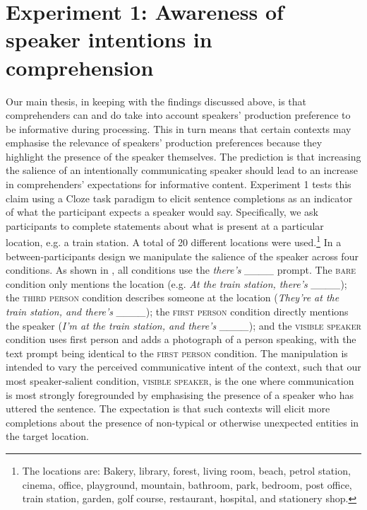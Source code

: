 \documentclass[output=paper,colorlinks,citecolor=brown]{langscibook}
\begin{document}
\section{Experiment 1: Awareness of speaker intentions in comprehension}
Our main thesis, in keeping with the findings discussed above, is that comprehenders can and do take into account speakers’ production preference to be informative during processing. This in turn means that certain contexts may emphasise the relevance of speakers’ production preferences because they highlight the presence of the speaker themselves. The prediction is that increasing the salience of an intentionally communicating speaker should lead to an increase in comprehenders’ expectations for informative content. Experiment 1 tests this claim using a Cloze task paradigm to elicit sentence completions as an indicator of what the participant expects a speaker would say. Specifically, we ask participants to complete statements about what is present at a particular location, e.g. a train station. A total of 20 different locations were used.\footnote{The locations are: Bakery, library, forest, living room, beach, petrol station, cinema, office, playground, mountain, bathroom, park, bedroom, post office, train station, garden, golf course, restaurant, hospital, and stationery shop.\label{fn:locations}} In a between-participants design we manipulate the salience of the speaker across four conditions. As shown in , all conditions use the \textit{there’s \mbox{\_\_\_\_}} prompt. The \textsc{bare} condition only mentions the location (e.g. \textit{At the train station, there’s \mbox{\_\_\_\_}}); the \textsc{\textsc{third person}} condition describes someone at the location (\textit{They’re at the train station, and there’s \_\_\_\_}); the \textsc{first person} condition directly mentions the speaker (\textit{I’m at the train station, and there’s \mbox{\_\_\_\_}}); and the \textsc{visible speaker} condition uses first person and adds a photograph of a person speaking, with the text prompt being identical to the \textsc{first person} condition. The manipulation is intended to vary the perceived communicative intent of the context, such that our most speaker-salient condition, \textsc{visible speaker}, is the one where communication is most strongly foregrounded by emphasising the presence of a speaker who has uttered the sentence. The expectation is that such contexts will elicit more completions about the presence of non-typical or otherwise unexpected entities in the target location.
\end{document}
